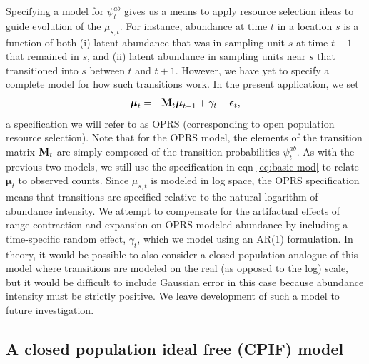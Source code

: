 \documentclass[times,mee,doublespace,]{besauth2}
\begin{document}
Specifying a model for $\psi^{ab}_t$ gives us a means to apply resource selection ideas to guide evolution of the $\mu_{s,t}$.  For instance, abundance at time $t$ in a location $s$ is a function of both (i) latent abundance that was in sampling unit $s$ at time $t-1$ that remained in $s$, and (ii) latent abundance in sampling units near $s$ that transitioned into $s$ between $t$ and $t+1$.  However, we have yet to specify a complete model for how such transitions work.  In the present application, we set
\begin{eqnarray*}
  \boldsymbol{\mu}_t & = & {\bf M}_t \boldsymbol{\mu}_{t-1} + \gamma_t + \boldsymbol{\epsilon}_t, %
\end{eqnarray*}
a specification we will refer to as OPRS (corresponding to open population resource selection). Note that for the OPRS model, the elements of the transition matrix ${\bf M}_t$ are simply composed of the transition probabilities $\psi_t^{ab}$.  As with the previous two models, we still use the specification in eqn \ref{eq:basic-mod} to relate $\boldsymbol{\mu}_t$ to observed counts.  
Since $\mu_{s,t}$ is modeled in log space, the OPRS specification means that transitions are specified relative to the natural logarithm of abundance intensity. We attempt to compensate for the artifactual effects of range contraction and expansion on OPRS modeled abundance by including a time-specific random effect, $\gamma_t$, which we model using an AR(1) formulation.  In theory, it would be possible to also consider a closed population analogue of this model where transitions are modeled on the real (as opposed to the log) scale, but it would be difficult to include Gaussian error in this case because abundance intensity must be strictly positive.  We leave development of such a model to future investigation.


\subsection{A closed population ideal free (CPIF) model}
\end{document}
